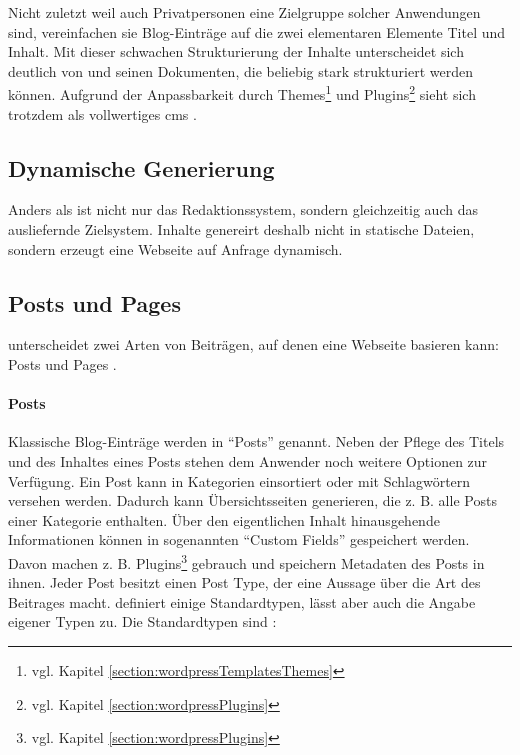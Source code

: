         Nicht zuletzt weil auch Privatpersonen eine Zielgruppe
        solcher Anwendungen sind, vereinfachen sie Blog-Einträge
        auf die zwei elementaren Elemente Titel und Inhalt.
        Mit dieser schwachen Strukturierung der Inhalte
        unterscheidet sich {\wordpress} deutlich von {\imperia}
        und seinen Dokumenten, die beliebig stark strukturiert
        werden können.
        Aufgrund der Anpassbarkeit durch Themes\footnote{vgl. Kapitel \ref{section:wordpressTemplatesThemes}}
        und Plugins\footnote{vgl. Kapitel \ref{section:wordpressPlugins}} sieht sich
        {\wordpress} trotzdem als vollwertiges \gls{cms}
        \cite{wordpress:About}.

    \subsection{Dynamische Generierung}
        \label{section:problemAnalysisWordPressDynamicGeneration}
        Anders als {\imperia} ist {\wordpress} nicht nur das Redaktionssystem,
        sondern gleichzeitig auch das ausliefernde Zielsystem.
        Inhalte genereirt {\wordpress} deshalb nicht in statische Dateien,
        sondern erzeugt eine Webseite auf Anfrage dynamisch.

    \subsection{Posts und Pages}
        \label{section:wordpressPostsPages}
        {\wordpress} unterscheidet zwei Arten von Beiträgen,
        auf denen eine Webseite basieren kann: Posts
        und Pages \cite{wordpress:Pages}.

        \paragraph*{Posts}
        Klassische Blog-Einträge werden in {\wordpress} "`Posts"' genannt.
        Neben der Pflege des Titels und des Inhaltes eines Posts stehen dem
        Anwender noch weitere Optionen zur Verfügung.
        Ein Post kann in Kategorien einsortiert oder mit Schlagwörtern versehen werden.
        Dadurch kann {\wordpress} Übersichtsseiten generieren,
        die z. B. alle Posts einer Kategorie enthalten.
        Über den eigentlichen Inhalt hinausgehende Informationen können
        in sogenannten "`Custom Fields"' gespeichert werden.
        Davon machen z. B. Plugins\footnote{vgl. Kapitel \ref{section:wordpressPlugins}} gebrauch
        und speichern Metadaten des Posts in ihnen.
        Jeder Post besitzt einen Post Type,
        der eine Aussage über die Art des Beitrages macht.
        {\wordpress} definiert einige Standardtypen,
        lässt aber auch die Angabe eigener Typen zu.
        Die Standardtypen sind
        \cite{wordpress:PostTypes}:

